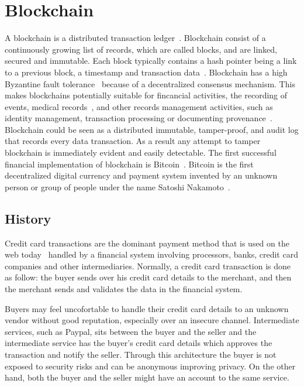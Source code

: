 \chapter{Blockchain}
\label{blockchain}

A blockchain is a distributed transaction ledger~\cite{nakamoto2012bitcoin}.
Blockchain consist of a continuously growing list of records, which are called blocks, and are linked, secured and immutable.
Each block typically contains a hash pointer being a link to a previous block, a timestamp and transaction data~\cite{wiki:blockchain}.
Blockchain has a high Byzantine fault tolerance~\cite{wiki:byzantine_fault_tolerance} because of a decentralized consensus mechanism.
This makes blockchains potentially suitable for fincancial activities, the recording of events, medical records~\cite{blockchain_ehr,Azaria2016}, and other records management activities,
such as identity management, transaction processing or documenting provenance~\cite{wiki:blockchain}. Blockchain could be seen as a distributed immutable, tamper-proof,
and audit log that records every data transaction. As a result any attempt to tamper blockchain is immediately evident and easily detectable.
The first successful financial implementation of blockchain is Bitcoin~\cite{nakamoto2012bitcoin}.
Bitcoin is the first decentralized digital currency and payment system invented by an unknown person or group of people under the name Satoshi Nakamoto~\cite{nakamoto2012bitcoin,wiki:bitcoin}.

\section{History}\label{blockchain:history}

Credit card transactions are the dominant payment method that is used on the web today~\cite{Narayanan:2016:BCT:2994437} handled by a financial
system involving processors, banks, credit card companies and other intermediaries. Normally, a credit card transaction is done as follow:
the buyer sends over his credit card details to the merchant, and then the merchant sends and validates the data in the financial system.

Buyers may feel uncofortable to handle their credit card details to an unknown vendor without good reputation, especially over an insecure channel.
Intermediate services, such as Paypal, sits between the buyer and the seller and the intermediate service has the buyer's credit card details which approves
the transaction and notify the seller. Through this architecture the buyer is not exposed to security risks and can be anonymous improving privacy. On the other hand,
both the buyer and the seller might have an account to the same service.

